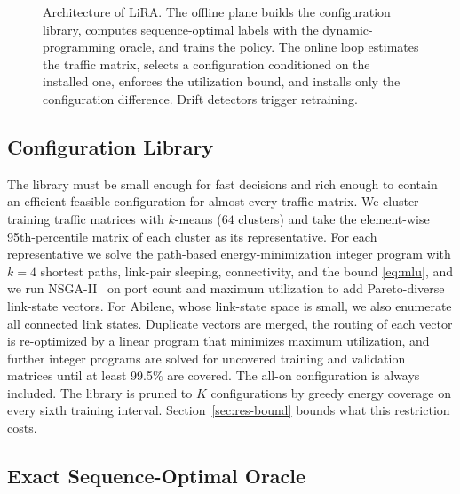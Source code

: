 \documentclass[journal]{IEEEtran}
\begin{document}
\begin{figure}[t]
{}
\caption{Architecture of LiRA. The offline plane builds the configuration library, computes sequence-optimal labels with the dynamic-programming oracle, and trains the policy. The online loop estimates the traffic matrix, selects a configuration conditioned on the installed one, enforces the utilization bound, and installs only the configuration difference. Drift detectors trigger retraining.}
\label{fig:arch}
\end{figure}

\subsection{Configuration Library}\label{sec:library}

The library must be small enough for fast decisions and rich enough to contain an efficient feasible configuration for almost every traffic matrix. We cluster training traffic matrices with $k$-means ($64$ clusters) and take the element-wise 95th-percentile matrix of each cluster as its representative. For each representative we solve the path-based energy-minimization integer program with $k=4$ shortest paths, link-pair sleeping, connectivity, and the bound \eqref{eq:mlu}, and we run NSGA-II~\cite{deb2002nsga2} on port count and maximum utilization to add Pareto-diverse link-state vectors. For Abilene, whose link-state space is small, we also enumerate all connected link states. Duplicate vectors are merged, the routing of each vector is re-optimized by a linear program that minimizes maximum utilization, and further integer programs are solved for uncovered training and validation matrices until at least 99.5\% are covered. The all-on configuration is always included. The library is pruned to $K$ configurations by greedy energy coverage on every sixth training interval. Section~\ref{sec:res-bound} bounds what this restriction costs.

\subsection{Exact Sequence-Optimal Oracle}
\end{document}
